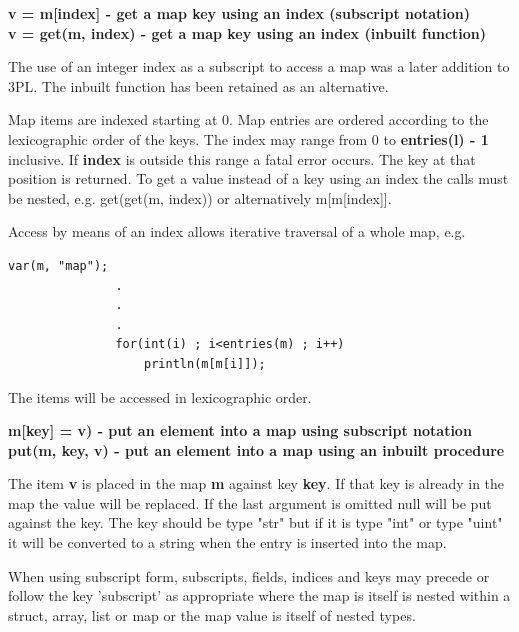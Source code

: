             
            {\bf v = m[index] - get a map key using an index (subscript notation)}\\
            {\bf v = get(m, index) - get a map key using an index (inbuilt function)}
            
            The use of an integer index as a subscript to access a map was a later addition
            to 3PL. The inbuilt function has been retained as an alternative.
            
            Map items are indexed starting at 0. Map entries are ordered
            according to the lexicographic order of the keys. The index may
            range from 0 to {\bf entries(l) - 1} inclusive. If {\bf index} is
            outside this range a fatal error occurs. The key at that position is
            returned. To get a value instead of a key using an index the calls
            must be nested, e.g. get(get(m, index)) or alternatively m[m[index]].
            
            Access by means of an index allows iterative traversal of a whole map,
            e.g.
            \begin{lstlisting}[gobble=12, language=threepl]
               var(m, "map");
               .
               .
               .
               for(int(i) ; i<entries(m) ; i++)
                   println(m[m[i]]);
            \end{lstlisting}
            
            The items will be accessed in lexicographic order.


            {\bf m[key] = v) - put an element into a map using subscript notation}\\
            {\bf put(m, key, v) - put an element into a map using an inbuilt procedure}
            
            The item {\bf v} is placed in the map {\bf m} against key
            {\bf key}. If that key is already in the map the value will
            be replaced. If the last argument is omitted null will be put
            against the key. The key should be type "str" but if it is type
            "int" or type "uint" it will be converted to a string when
            the entry is inserted into the map.
            
            When using subscript form, subscripts, fields, indices and keys
            may precede or follow the key 'subscript' as appropriate where
            the map is itself is nested within a struct, array, list or map or
            the map value is itself of nested types.


